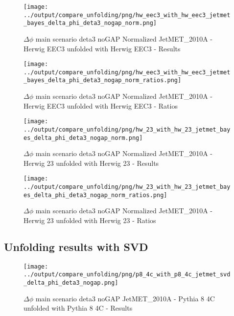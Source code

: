 \documentclass[11pt]{book}
\begin{document}
\begin{figure}[ht]
\centering
\texttt{[image: ../output/compare\_unfolding/png/hw\_eec3\_with\_hw\_eec3\_jetmet\_bayes\_delta\_phi\_deta3\_nogap\_norm.png]}
\caption{$\Delta\phi$ main scenario deta3 noGAP Normalized JetMET\_2010A - Herwig EEC3 unfolded with Herwig EEC3 - Results}
\label{hw_eec3_hw_eec3_jetmet_bayes_delta_phi_deta3_nogap_norm_a}
\end{figure}

\begin{figure}[ht]
\centering
\texttt{[image: ../output/compare\_unfolding/png/hw\_eec3\_with\_hw\_eec3\_jetmet\_bayes\_delta\_phi\_deta3\_nogap\_norm\_ratios.png]}
\caption{$\Delta\phi$ main scenario deta3 noGAP Normalized JetMET\_2010A - Herwig EEC3 unfolded with Herwig EEC3 - Ratios}
\label{hw_eec3_hw_eec3_jetmet_bayes_delta_phi_deta3_nogap_norm_b}
\end{figure}

\begin{figure}[ht]
\centering
\texttt{[image: ../output/compare\_unfolding/png/hw\_23\_with\_hw\_23\_jetmet\_bayes\_delta\_phi\_deta3\_nogap\_norm.png]}
\caption{$\Delta\phi$ main scenario deta3 noGAP Normalized JetMET\_2010A - Herwig 23 unfolded with Herwig 23 - Results}
\label{hw_23_hw_23_jetmet_bayes_delta_phi_deta3_nogap_norm_a}
\end{figure}

\begin{figure}[ht]
\centering
\texttt{[image: ../output/compare\_unfolding/png/hw\_23\_with\_hw\_23\_jetmet\_bayes\_delta\_phi\_deta3\_nogap\_norm\_ratios.png]}
\caption{$\Delta\phi$ main scenario deta3 noGAP Normalized JetMET\_2010A - Herwig 23 unfolded with Herwig 23 - Ratios}
\label{hw_23_hw_23_jetmet_bayes_delta_phi_deta3_nogap_norm_b}
\end{figure}




\clearpage
\subsection{Unfolding results with SVD}

\begin{figure}[ht]
\centering
\texttt{[image: ../output/compare\_unfolding/png/p8\_4c\_with\_p8\_4c\_jetmet\_svd\_delta\_phi\_deta3\_nogap.png]}
\caption{$\Delta\phi$ main scenario deta3 noGAP JetMET\_2010A - Pythia 8 4C unfolded with Pythia 8 4C - Results}
\label{p8_p8_jetmet_svd_delta_phi_deta3_nogap_a}
\end{figure}
\end{document}
